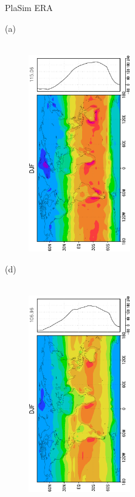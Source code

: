 \documentclass[12pt,a4paper,twoside,openright,headinclude,liststotoc,bibtotoc]{scrreprt}
\begin{document}
\begin{figure}[H]
\hspace{3.0cm}PlaSim \vspace{0.2cm}\hspace{7.3cm} ERA \\
\parbox{8.5cm}{\hspace{0.50cm}\begin{scriptsize}(a)\end{scriptsize} \vspace{-0.7cm} \\
\includegraphics[height=8.5cm,width=6.5cm,angle=-90]
{eps/zonalysmsfcnetradDJF.eps}
}
\parbox{8.5cm}{\hspace{0.50cm}\begin{scriptsize}(d)\end{scriptsize} \vspace{-0.7cm} \\
\includegraphics[height=8.5cm,width=6.5cm,angle=-90]
{eps/zonalfinalt21ysmsfcnetradDJF.eps}
}
\end{figure}
\end{document}
